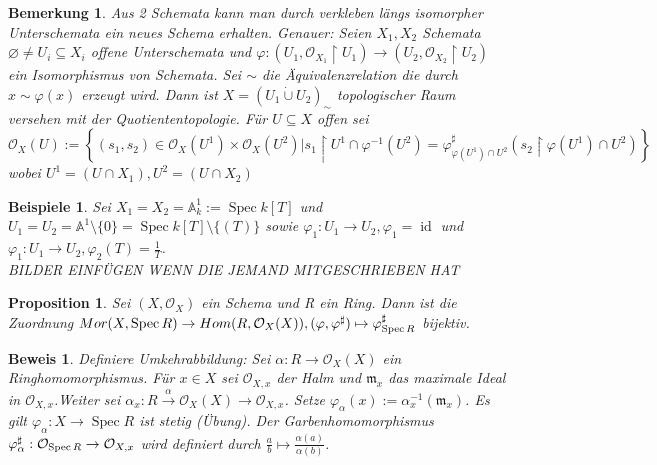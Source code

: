 \documentclass[a4paper,oneside]{scrbook}
\theoremstyle{break}
\newtheorem{Bem}[Def]{Bemerkung}
\newtheorem{Prop}[Def]{Proposition}
\newtheorem{Bsp}[Def]{Beispiele}
\theoremstyle{nonumberbreak}
\theoremstyle{nonumberplain}
\newtheorem{Bew}{Beweis}
\theoremstyle{break}
\renewcommand{\emptyset}{%
	\ensuremath{\varnothing}%
}
\newcommand{\Spec}{%
	\ensuremath{\operatorname{Spec}}%
}
\DeclareMathOperator{\id}{id}
\begin{document}
\begin{Bem}
	Aus 2 Schemata kann man durch verkleben längs isomorpher Unterschemata ein neues Schema erhalten.
	Genauer: Seien $X_1,X_2$ Schemata $\emptyset \neq U_i \subseteq X_i$ offene Unterschemata und $\varphi: \left( U_1, \mathcal{O}_{X_1} \restriction U_1 \right) \rightarrow \left( U_2, \mathcal{O}_{X_2} \restriction U_2 \right)$ ein Isomorphismus von Schemata. Sei $\sim$ die Äquivalenzrelation die durch $x \sim \varphi (x)$ erzeugt wird. Dann ist $X=(U_1 \dot\cup U_2)_\sim $ topologischer Raum versehen mit der Quotiententopologie. Für $U \subseteq X$ offen sei $\mathcal{O}_X(U):=\left\lbrace  (s_1,s_2) \in \mathcal{O}_X(U^1) \times \mathcal{O}_X(U^2) | s_1 \restriction U^1 \cap \varphi^{-1}(U^2) = \varphi^\sharp_{\varphi(U^1) \cap U^2}(s_2 \restriction \varphi(U^1) \cap U^2) \right\rbrace$ wobei $U^1=(U \cap X_1), U^2=(U \cap X_2)$
\end{Bem}

\begin{Bsp}
 Sei $X_1 = X_2 = \mathbb{A}^1_k:=\Spec k[T]$ und 
 $U_1=U_2=\mathbb{A}^1 \setminus \{0\} = \Spec k[T] \setminus \{(T)\}$ sowie $\varphi_1 : U_1 \rightarrow U_2, \varphi_1 = \id$ und $\varphi_1: U_1 \rightarrow U_2, \varphi_2(T) = \frac{1}{T} $.\\ BILDER EINFÜGEN WENN DIE JEMAND MITGESCHRIEBEN HAT
\end{Bsp}

\begin{Prop}
	Sei $\left(X, \mathcal{O}_X \right)$ ein Schema und R ein Ring. Dann ist die Zuordnung $Mor(X, \Spec R) \rightarrow Hom(R, \mathcal{O}_X(X)), (\varphi, \varphi^\sharp) \mapsto \varphi^\sharp_{\Spec R}$ bijektiv.
\end{Prop}
\begin{Bew}
	Definiere Umkehrabbildung: Sei $\alpha : R \rightarrow \mathcal{O}_X(X)$ ein Ringhomomorphismus. Für $x \in X$ sei $\mathcal{O}_{X,x}$ der Halm und $\mathfrak{m}_x$ das maximale Ideal in $\mathcal{O}_{X,x}$.Weiter sei $\alpha_x: R \stackrel{\alpha}\rightarrow \mathcal{O}_{X}(X) \rightarrow \mathcal{O}_{X,x}$. Setze $\varphi_\alpha(x):=\alpha^{-1}_x(\mathfrak{m}_x)$. Es gilt $\varphi_\alpha : X \rightarrow \Spec R $ ist stetig (Übung). Der Garbenhomomorphismus $\varphi_\alpha^\sharp : \mathcal{O}_{\Spec R} \rightarrow \mathcal{O}_{X,x}$ wird definiert durch $\frac{a}{b} \mapsto \frac{\alpha(a)}{\alpha(b)}$.
\end{Bew}
\end{document}
